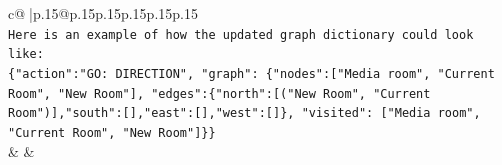 \documentclass{article}
\begin{document}
{\begin{supertabular}{c@{$\;$}|p{.15\linewidth}@{}p{.15\linewidth}p{.15\linewidth}p{.15\linewidth}p{.15\linewidth}p{.15\linewidth}}
{{{\\ 
\texttt{Here is an example of how the updated graph dictionary could look like:} \\
\texttt{\{"action":"GO: DIRECTION", "graph": \{"nodes":{[}"Media room", "Current Room", "New Room"{]}, "edges":\{"north":{[}("New Room", "Current Room"){]},"south":{[}{]},"east":{[}{]},"west":{[}{]}\}, "visited": {[}"Media room", "Current Room", "New Room"{]}\}\}} \\
            }
        }
    }
    & & \\ \\

\end{supertabular}
}
\end{document}
